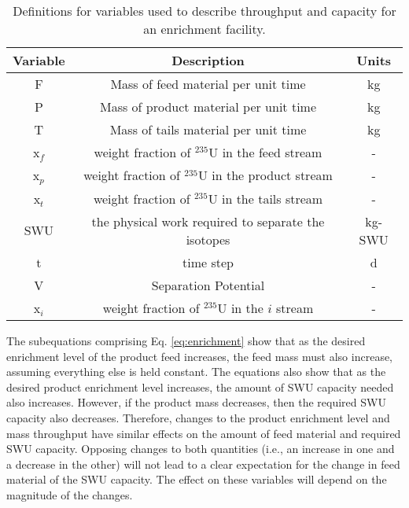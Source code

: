 \begin{table}[ht]
    \centering
    \caption{Definitions for variables used to describe throughput and 
    capacity for an enrichment facility.}
    \label{tab:enrichment_variables}
    \begin{tabular}{c c c}
        \hline
        Variable & Description & Units\\\hline
        F & Mass of feed material per unit time & kg\\
        P & Mass of product material per unit time & kg \\
        T & Mass of tails material per unit time & kg\\
        x$_f$ & weight fraction of $^{235}$U in the feed stream & -\\
        x$_p$ & weight fraction of $^{235}$U in the product stream & - \\
        x$_t$ & weight fraction of $^{235}$U in the tails stream & - \\
        \gls{SWU} & the physical work required to separate the isotopes & kg-SWU\\
        t & time step & d\\
        V & Separation Potential & - \\
        x$_i$ & weight fraction of $^{235}$U in the $i$ stream & - \\
        \hline
    \end{tabular}
\end{table}

The subequations comprising Eq. \ref{eq:enrichment} show that as the desired 
enrichment level 
of the product feed increases, the feed mass must also increase, assuming everything 
else is held constant. The equations also show that as the desired 
product 
enrichment level increases, the amount of \gls{SWU} capacity needed also increases. 
However, if the product mass decreases, then the required \gls{SWU} capacity 
also decreases. Therefore, changes to the product enrichment level and mass 
throughput have similar effects on the amount of feed material and required 
\gls{SWU} capacity. Opposing changes to both quantities 
(i.e., an increase in one and a decrease in the other) will not lead to a clear 
expectation for the change in feed material of the \gls{SWU} capacity. 
The effect on these variables will depend on the magnitude of the changes.

